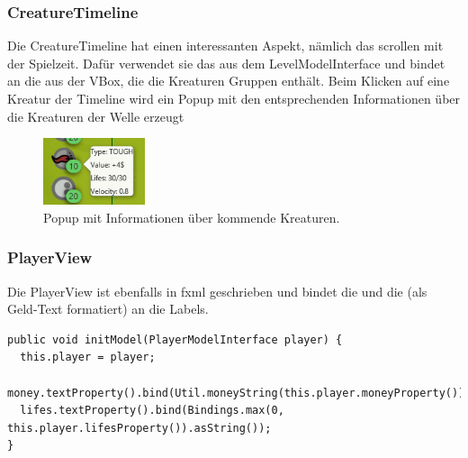 \subsubsection{CreatureTimeline} %
\label{ssub:creaturetimeline}
Die CreatureTimeline hat einen interessanten Aspekt, nämlich das scrollen mit der Spielzeit. Dafür verwendet sie das  aus dem LevelModelInterface und bindet an die  aus der VBox, die die Kreaturen Gruppen enthält. Beim Klicken auf eine Kreatur der Timeline wird ein Popup mit den entsprechenden Informationen über die Kreaturen der Welle erzeugt
\begin{figure}[htb]
  \centering
  \includegraphics[width=3cm]{images/timeline.png}
  \caption{Popup mit Informationen über kommende Kreaturen.}
\end{figure}



\subsubsection{PlayerView} %
\label{ssub:playerview}
Die PlayerView ist ebenfalls in fxml geschrieben und bindet die  und die  (als Geld-Text formatiert) an die Labels. 
\begin{lstlisting}
public void initModel(PlayerModelInterface player) {
  this.player = player;
  money.textProperty().bind(Util.moneyString(this.player.moneyProperty()));
  lifes.textProperty().bind(Bindings.max(0, this.player.lifesProperty()).asString());
}
\end{lstlisting}

